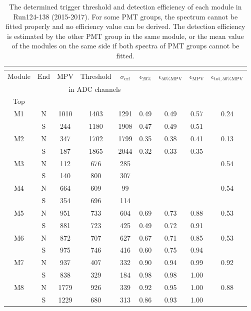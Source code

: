 \small
\begin{longtable}{c c c c c c c c c}
  \caption{The determined trigger threshold and detection efficiency of each module in Run124-138 (2015-2017).  For some PMT groups, the spectrum cannot be fitted properly and no efficiency value can be derived. The detection efficiency is estimated by the other PMT group in the same module, or the mean value of the modules on the same side if both spectra of PMT groups cannot be fitted.} \\
  \label{tab:mpv-full2}\\
  \toprule
  Module & End & MPV & Threshold & $\sigma{}_{\mathrm{erf}}$ & $\epsilon_{20\%}$ & $\epsilon_{50\%\mathrm{MPV}}$ & $\epsilon_{\mathrm{MPV}}$ & $\epsilon_{\mathrm{tot}, 50\%\mathrm{MPV}}$ \\
         &     & \multicolumn{3}{|c|}{in ADC channels} &   \\
  \midrule
  \endfirsthead
  Top\\
  \midrule
  M1 & N & 1010 & 1403 & 1291 & 0.49 & 0.49 & 0.57 & \multirow{2}{*}{0.24}\\
     & S & 244 & 1180 & 1908 & 0.47 & 0.49 & 0.51 & \\
  M2 & N & 347 & 1702 & 1799 & 0.35 & 0.38 & 0.41 & \multirow{2}{*}{0.13}\\
     & S & 187 & 1865 & 2044 & 0.32 & 0.33 & 0.35 &\\
  M3 & N & 112 & 676 & 285 &  &  &  & \multirow{2}{*}{0.54}\\
     & S & 140 & 800 & 307 &  &  &  & \\
  M4 & N & 664 & 609 & 99  &  &  & & \multirow{2}{*}{0.54}\\
     & S & 354 & 696 & 114 &  &  & & \\
  M5 & N & 951 & 733 & 604 & 0.69 & 0.73 & 0.88 & \multirow{2}{*}{0.53}\\
     & S & 881 & 723 & 425 & 0.49 & 0.72 & 0.91 &\\
  M6 & N & 872 & 707 & 627 & 0.67 & 0.71 & 0.85 & \multirow{2}{*}{0.53}\\
     & S & 975 & 746 & 416 & 0.60 & 0.75 & 0.94 &\\
  M7 & N & 937 & 407 & 332 & 0.90 & 0.94 & 0.99 & \multirow{2}{*}{0.92}\\
     & S & 838 & 329 & 184 & 0.98 & 0.98 & 1.00 & \\
  M8 & N & 1779 & 926 & 339 & 0.92 & 0.95 & 1.00 & \multirow{2}{*}{0.88}\\
     & S & 1229 & 680 & 313 & 0.86 & 0.93 & 1.00 &\\

\end{longtable}
